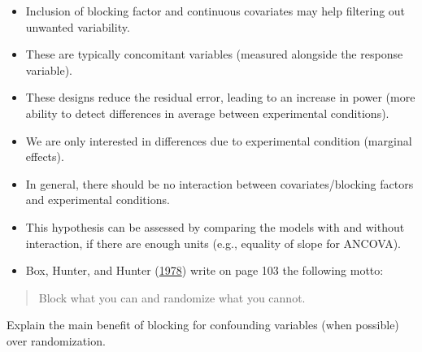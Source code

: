 \documentclass[
  11pt,
  letterpaper,
]{scrbook}
\providecommand{\tightlist}{%
  \setlength{\itemsep}{0pt}\setlength{\parskip}{0pt}}\usepackage{longtable,booktabs,array}
\theoremstyle{definition}
\theoremstyle{remark}
\begin{document}
\begin{tcolorbox}[enhanced jigsaw, breakable, toptitle=1mm, left=2mm, bottomrule=.15mm, colframe=quarto-callout-important-color-frame, colback=white, rightrule=.15mm, title=\textcolor{quarto-callout-important-color}{\faExclamation}\hspace{0.5em}{\textbf{Summary}}, opacityback=0, toprule=.15mm, titlerule=0mm, colbacktitle=quarto-callout-important-color!10!white, bottomtitle=1mm, arc=.35mm, coltitle=black, opacitybacktitle=0.6, leftrule=.75mm]

\begin{itemize}
\tightlist
\item
  Inclusion of blocking factor and continuous covariates may help
  filtering out unwanted variability.
\item
  These are typically concomitant variables (measured alongside the
  response variable).
\item
  These designs reduce the residual error, leading to an increase in
  power (more ability to detect differences in average between
  experimental conditions).
\item
  We are only interested in differences due to experimental condition
  (marginal effects).
\item
  In general, there should be no interaction between covariates/blocking
  factors and experimental conditions.
\item
  This hypothesis can be assessed by comparing the models with and
  without interaction, if there are enough units (e.g., equality of
  slope for ANCOVA).
\end{itemize}

\end{tcolorbox}

\begin{tcolorbox}[enhanced jigsaw, breakable, toptitle=1mm, left=2mm, bottomrule=.15mm, colframe=quarto-callout-tip-color-frame, colback=white, rightrule=.15mm, title=\textcolor{quarto-callout-tip-color}{\faLightbulb}\hspace{0.5em}{Your turn}, opacityback=0, toprule=.15mm, titlerule=0mm, colbacktitle=quarto-callout-tip-color!10!white, bottomtitle=1mm, arc=.35mm, coltitle=black, opacitybacktitle=0.6, leftrule=.75mm]

\begin{itemize}
\tightlist
\item
  Box, Hunter, and Hunter (\protect\hyperlink{ref-Box:1978}{1978}) write
  on page 103 the following motto:
\end{itemize}

\begin{quote}
Block what you can and randomize what you cannot.
\end{quote}

Explain the main benefit of blocking for confounding variables (when
possible) over randomization.

\end{tcolorbox}
\end{document}
